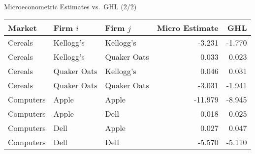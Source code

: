 \documentclass[
  10pt,               %
  aspectratio=169,     %
]{beamer}
\theoremstyle{plain}
\begin{document}
\begin{frame}[t]{Microeconometric Estimates vs.\ GHL \citep{Pellegrino2024-dn}  (2/2)}
  \begin{center}
    \begin{tabular}{lllrr}
      \toprule
      Market    & Firm $i$    & Firm $j$    & Micro Estimate & GHL    \\
      \midrule
      Cereals   & Kellogg's   & Kellogg's   & -3.231         & -1.770 \\
      Cereals   & Kellogg's   & Quaker Oats & 0.033          & 0.023  \\
      Cereals   & Quaker Oats & Kellogg's   & 0.046          & 0.031  \\
      Cereals   & Quaker Oats & Quaker Oats & -3.031         & -1.941 \\
      \addlinespace
      Computers & Apple       & Apple       & -11.979        & -8.945 \\
      Computers & Apple       & Dell        & 0.018          & 0.025  \\
      Computers & Dell        & Apple       & 0.027          & 0.047  \\
      Computers & Dell        & Dell        & -5.570         & -5.110 \\
      \bottomrule
    \end{tabular}
  \end{center}

  \hyperlink{product_identification}{}
\end{frame}
\end{document}
